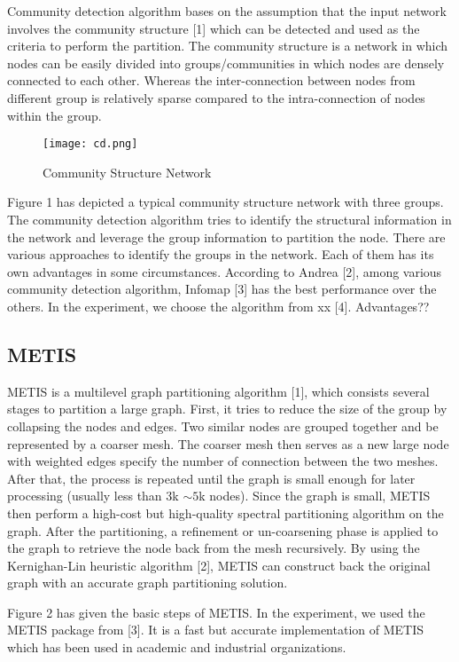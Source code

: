 Community detection algorithm bases on the assumption that the input network involves the community structure [1] which can be detected and used as the criteria to perform the partition. The community structure is a network in which nodes can be easily divided into groups/communities in which nodes are densely connected to each other. Whereas the inter-connection between nodes from different group is relatively sparse compared to the intra-connection of nodes within the group.

\begin{figure}[t]
  \centering
  \texttt{[image: cd.png]}
  \caption{Community Structure Network}\label{fig:cd}
\end{figure}


Figure 1 has depicted a typical community structure network with three groups. The community detection algorithm tries to identify the structural information in the network and leverage the group information to partition the node. There are various approaches to identify the groups in the network. Each of them has its own advantages in some circumstances. According to Andrea [2], among various community detection algorithm, Infomap [3] has the best performance over the others. In the experiment, we choose the algorithm from xx [4]. Advantages??


\subsection{METIS}

METIS is a multilevel graph partitioning algorithm [1], which consists several stages to partition a large graph. First, it tries to reduce the size of the group by collapsing the nodes and edges. Two similar nodes are grouped together and be represented by a coarser mesh. The coarser mesh then serves as a new large node with weighted edges specify the number of connection between the two meshes. After that, the process is repeated until the graph is small enough for later processing (usually less than $3$k $\sim 5$k nodes). Since the graph is small, METIS then perform a high-cost but high-quality spectral partitioning algorithm on the graph. After the partitioning, a refinement or un-coarsening phase is applied to the graph to retrieve the node back from the mesh recursively. By using the Kernighan-Lin heuristic algorithm [2], METIS can construct back the original graph with an accurate graph partitioning solution.

Figure 2 has given the basic steps of METIS. In the experiment, we used the METIS package from [3]. It is a fast but accurate implementation of METIS which has been used in academic and industrial organizations.

